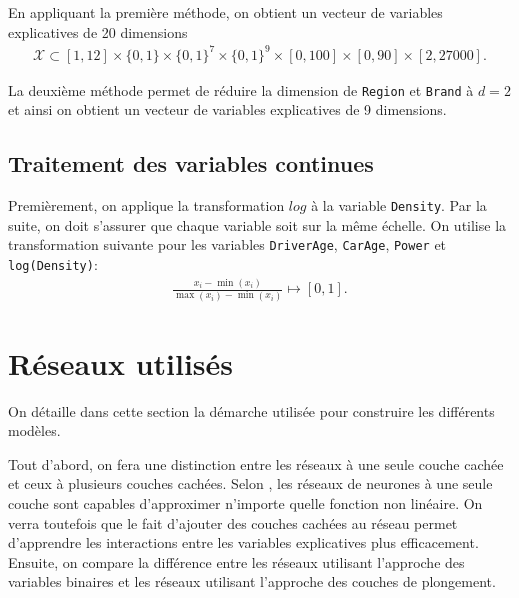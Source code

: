 En appliquant la première méthode, on obtient un vecteur de variables explicatives de 20 dimensions
\begin{align*}
\mathcal{X} \subset[1,12] \times\{0,1\} \times\{0,1\}^{7} \times\{0,1\}^{9} \times[0,100] \times[0,90] \times[2,27000].
\end{align*}

La deuxième méthode permet de réduire la dimension de \verb=Region= et \verb=Brand= à $d=2$ et ainsi on obtient un vecteur de variables explicatives de 9 dimensions. 





\subsection{Traitement des variables continues}
\label{subsec:TraitementVarContinues}

Premièrement, on applique la transformation $log$ à la variable \verb=Density=. Par la suite, on doit s'assurer que chaque variable soit sur la même échelle. On utilise la transformation suivante pour les variables \verb=DriverAge=, \verb=CarAge=, \verb=Power= et \verb=log(Density)=:
\begin{align*}
\frac{x_i-\min (x_i)}{\max (x_i)-\min (x_i)} \mapsto [0,1].
\end{align*}

\section{Réseaux utilisés}
\label{sec:app:reseauxutilisés}

On détaille dans cette section la démarche utilisée pour construire les différents modèles. 

Tout d'abord, on fera une distinction entre les réseaux à une seule couche cachée et ceux à plusieurs couches cachées. Selon %
, les réseaux de neurones à une seule couche sont capables d'approximer n'importe quelle fonction non linéaire. On verra toutefois que le fait d'ajouter des couches cachées au réseau permet d'apprendre les interactions entre les variables explicatives plus efficacement. Ensuite, on compare la différence entre les réseaux utilisant l'approche des variables binaires et les réseaux utilisant l'approche des couches de plongement. %

